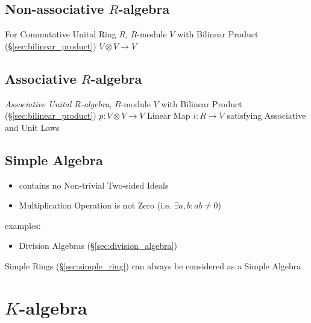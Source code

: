 \subsection{Non-associative $R$-algebra}
\label{sec:nonassociative_r_algebra}

For Commutative Unital Ring $R$, $R$-module $V$ with Bilinear Product
(\S\ref{sec:bilinear_product}) $V \otimes V \rightarrow V$



\subsection{Associative $R$-algebra}\label{sec:associative_r_algebra}

\emph{Associative Unital $R$-algebra}, $R$-module $V$ with Bilinear
Product (\S\ref{sec:bilinear_product}) $p : V \otimes V \rightarrow V$
Linear Map $i : R \rightarrow V$ satisfying Associative and Unit Laws



\subsection{Simple Algebra}\label{sec:simple_algebra}

\begin{itemize}
  \item contains no Non-trivial Two-sided Ideals
  \item Multiplication Operation is not Zero (i.e. $\exists a, b : ab \neq 0$)
\end{itemize}

examples:
\begin{itemize}
  \item Division Algebras (\S\ref{sec:division_algebra})
\end{itemize}

Simple Rings (\S\ref{sec:simple_ring}) can always be considered as a Simple
Algebra



\section{$K$-algebra}\label{sec:k_algebra}

